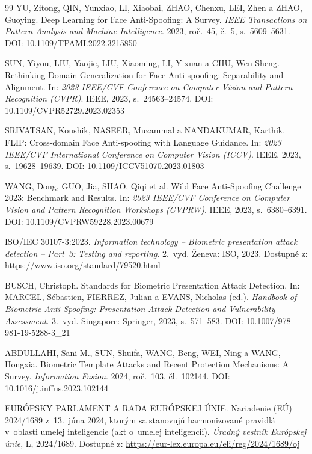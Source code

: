 \documentclass[12pt,a4paper,oneside]{report}
\begin{document}
\begin{thebibliography}{99}
YU, Zitong, QIN, Yunxiao, LI, Xiaobai, ZHAO, Chenxu, LEI, Zhen a ZHAO, Guoying.
Deep Learning for Face Anti-Spoofing: A Survey.
\textit{IEEE Transactions on Pattern Analysis and Machine Intelligence}. 2023,
roč.~45, č.~5, s.~5609--5631.
DOI: 10.1109/TPAMI.2022.3215850

SUN, Yiyou, LIU, Yaojie, LIU, Xiaoming, LI, Yixuan a CHU, Wen-Sheng.
Rethinking Domain Generalization for Face Anti-spoofing: Separability and Alignment.
In: \textit{2023 IEEE/CVF Conference on Computer Vision and Pattern Recognition (CVPR)}.
IEEE, 2023, s.~24563--24574.
DOI: 10.1109/CVPR52729.2023.02353

SRIVATSAN, Koushik, NASEER, Muzammal a NANDAKUMAR, Karthik.
FLIP: Cross-domain Face Anti-spoofing with Language Guidance.
In: \textit{2023 IEEE/CVF International Conference on Computer Vision (ICCV)}.
IEEE, 2023, s.~19628--19639.
DOI: 10.1109/ICCV51070.2023.01803

WANG, Dong, GUO, Jia, SHAO, Qiqi et al.
Wild Face Anti-Spoofing Challenge 2023: Benchmark and Results.
In: \textit{2023 IEEE/CVF Conference on Computer Vision and Pattern Recognition
Workshops (CVPRW)}. IEEE, 2023, s.~6380--6391.
DOI: 10.1109/CVPRW59228.2023.00679

ISO/IEC 30107-3:2023.
\textit{Information technology -- Biometric presentation attack detection --
Part~3: Testing and reporting}. 2.~vyd. Ženeva: ISO, 2023.
Dostupné z: \url{https://www.iso.org/standard/79520.html}

BUSCH, Christoph.
Standards for Biometric Presentation Attack Detection.
In: MARCEL, Sébastien, FIERREZ, Julian a EVANS, Nicholas (ed.).
\textit{Handbook of Biometric Anti-Spoofing: Presentation Attack Detection and
Vulnerability Assessment}. 3.~vyd. Singapore: Springer, 2023, s.~571--583.
DOI: 10.1007/978-981-19-5288-3\_21

ABDULLAHI, Sani M., SUN, Shuifa, WANG, Beng, WEI, Ning a WANG, Hongxia.
Biometric Template Attacks and Recent Protection Mechanisms: A Survey.
\textit{Information Fusion}. 2024, roč.~103, čl.~102144.
DOI: 10.1016/j.inffus.2023.102144

EURÓPSKY PARLAMENT A RADA EURÓPSKEJ ÚNIE.
Nariadenie (EÚ) 2024/1689 z~13.~júna 2024, ktorým sa stanovujú harmonizované pravidlá
v~oblasti umelej inteligencie (akt o~umelej inteligencii).
\textit{Úradný vestník Európskej únie}, L, 2024/1689.
Dostupné z: \url{https://eur-lex.europa.eu/eli/reg/2024/1689/oj}


\end{thebibliography}
\end{document}
